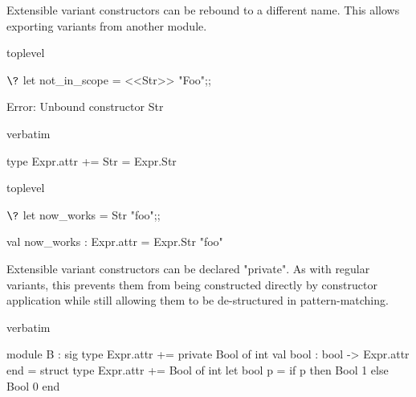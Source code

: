 {Extensible variant constructors can be rebound to a different name. This
allows exporting variants from another module.
\begin{camlexample}{toplevel}
\begin{caml}
\begin{camlinput}
$\?$ let not_in_scope = <<Str>> "Foo";;
\end{camlinput}
\begin{camlerror}
Error: Unbound constructor Str
\end{camlerror}
\end{caml}
\end{camlexample}
\begin{camlexample}{verbatim}
\begin{caml}
\begin{camlinput}
type Expr.attr += Str = Expr.Str
\end{camlinput}
\end{caml}
\end{camlexample}
\begin{camlexample}{toplevel}
\begin{caml}
\begin{camlinput}
$\?$ let now_works = Str "foo";;
\end{camlinput}
\begin{camloutput}
val now_works : Expr.attr = Expr.Str "foo"
\end{camloutput}
\end{caml}
\end{camlexample}

Extensible variant constructors can be declared "private". As with
regular variants, this prevents them from being constructed directly by
constructor application while still allowing them to be de-structured in
pattern-matching.
\begin{camlexample}{verbatim}
\begin{caml}
\begin{camlinput}
module B : sig
  type Expr.attr += private Bool of int
  val bool : bool -> Expr.attr
end = struct
  type Expr.attr += Bool of int
  let bool p = if p then Bool 1 else Bool 0
end
\end{camlinput}
\end{caml}
\end{camlexample}

}
